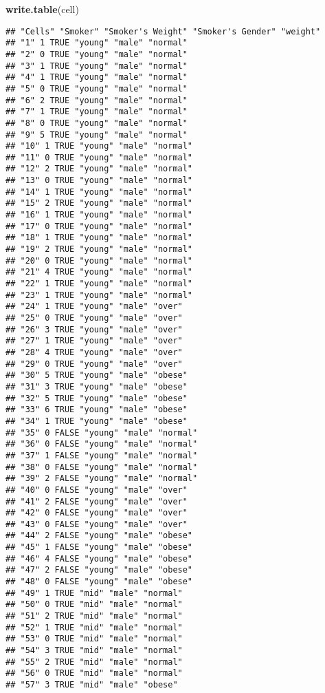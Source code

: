 \documentclass[]{article}
\newenvironment{Shaded}{\begin{snugshade}}{\end{snugshade}}
\newcommand{\KeywordTok}[1]{\textcolor[rgb]{0.13,0.29,0.53}{\textbf{#1}}}
\newcommand{\NormalTok}[1]{#1}
\begin{document}
\begin{Shaded}
\begin{Highlighting}[]
\KeywordTok{write.table}\NormalTok{(cell)}
\end{Highlighting}
\end{Shaded}

\begin{verbatim}
## "Cells" "Smoker" "Smoker's Weight" "Smoker's Gender" "weight"
## "1" 1 TRUE "young" "male" "normal"
## "2" 0 TRUE "young" "male" "normal"
## "3" 1 TRUE "young" "male" "normal"
## "4" 1 TRUE "young" "male" "normal"
## "5" 0 TRUE "young" "male" "normal"
## "6" 2 TRUE "young" "male" "normal"
## "7" 1 TRUE "young" "male" "normal"
## "8" 0 TRUE "young" "male" "normal"
## "9" 5 TRUE "young" "male" "normal"
## "10" 1 TRUE "young" "male" "normal"
## "11" 0 TRUE "young" "male" "normal"
## "12" 2 TRUE "young" "male" "normal"
## "13" 0 TRUE "young" "male" "normal"
## "14" 1 TRUE "young" "male" "normal"
## "15" 2 TRUE "young" "male" "normal"
## "16" 1 TRUE "young" "male" "normal"
## "17" 0 TRUE "young" "male" "normal"
## "18" 1 TRUE "young" "male" "normal"
## "19" 2 TRUE "young" "male" "normal"
## "20" 0 TRUE "young" "male" "normal"
## "21" 4 TRUE "young" "male" "normal"
## "22" 1 TRUE "young" "male" "normal"
## "23" 1 TRUE "young" "male" "normal"
## "24" 1 TRUE "young" "male" "over"
## "25" 0 TRUE "young" "male" "over"
## "26" 3 TRUE "young" "male" "over"
## "27" 1 TRUE "young" "male" "over"
## "28" 4 TRUE "young" "male" "over"
## "29" 0 TRUE "young" "male" "over"
## "30" 5 TRUE "young" "male" "obese"
## "31" 3 TRUE "young" "male" "obese"
## "32" 5 TRUE "young" "male" "obese"
## "33" 6 TRUE "young" "male" "obese"
## "34" 1 TRUE "young" "male" "obese"
## "35" 0 FALSE "young" "male" "normal"
## "36" 0 FALSE "young" "male" "normal"
## "37" 1 FALSE "young" "male" "normal"
## "38" 0 FALSE "young" "male" "normal"
## "39" 2 FALSE "young" "male" "normal"
## "40" 0 FALSE "young" "male" "over"
## "41" 2 FALSE "young" "male" "over"
## "42" 0 FALSE "young" "male" "over"
## "43" 0 FALSE "young" "male" "over"
## "44" 2 FALSE "young" "male" "obese"
## "45" 1 FALSE "young" "male" "obese"
## "46" 4 FALSE "young" "male" "obese"
## "47" 2 FALSE "young" "male" "obese"
## "48" 0 FALSE "young" "male" "obese"
## "49" 1 TRUE "mid" "male" "normal"
## "50" 0 TRUE "mid" "male" "normal"
## "51" 2 TRUE "mid" "male" "normal"
## "52" 1 TRUE "mid" "male" "normal"
## "53" 0 TRUE "mid" "male" "normal"
## "54" 3 TRUE "mid" "male" "normal"
## "55" 2 TRUE "mid" "male" "normal"
## "56" 0 TRUE "mid" "male" "normal"
## "57" 3 TRUE "mid" "male" "obese"

\end{verbatim}
\end{document}
